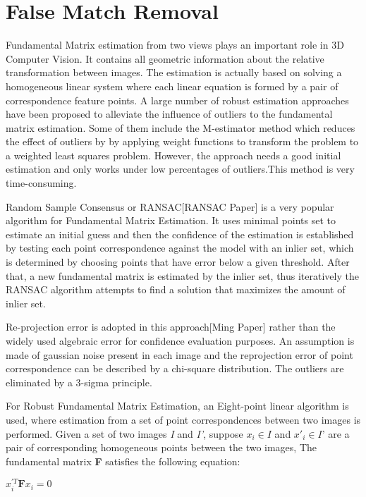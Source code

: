 \section{False Match Removal} 

Fundamental Matrix estimation from two views plays an important role in 3D Computer Vision. It contains all geometric information about the relative transformation between images. The estimation is actually based on solving a homogeneous linear system where each linear equation is formed by a pair of correspondence feature points. A large number of robust estimation approaches have been proposed to alleviate the influence of outliers to the fundamental matrix estimation. Some of them include the M-estimator method which reduces the effect of outliers by by applying weight functions to transform the problem to a weighted least squares problem. However, the approach needs a good initial estimation and only works under low percentages of outliers.This method is very time-consuming.

Random Sample Consensus or RANSAC[RANSAC Paper] is a very popular algorithm for Fundamental Matrix Estimation. It uses minimal points set to estimate an initial guess and then the confidence of the estimation is established by testing each point correspondence against the model with an inlier set, which is determined by choosing points that have error below a given threshold. After that, a new fundamental matrix is estimated by the inlier set, thus iteratively the RANSAC algorithm attempts to find a solution that maximizes the amount of inlier set.

Re-projection error is adopted in this approach[Ming Paper] rather than the widely used algebraic error for confidence evaluation purposes.  An assumption is made of gaussian noise present in each image and the reprojection error of point correspondence can be described by a chi-square distribution. The outliers are eliminated by a 3-sigma principle.

For Robust Fundamental Matrix Estimation, an Eight-point linear algorithm is used, where  estimation from a set of point correspondences between two images is performed. Given a set of two images \textit{I} and \textit{I'}, suppose $x_i \in \textit{I}$ and $x'_{i} \in \textit{I'} $ are a pair of corresponding homogeneous points between the two images, The fundamental matrix \textbf{F} satisfies the following equation:

\begin{center}
	$x^{'T}_i \textbf{F} x_i  = 0$
\end{center}

